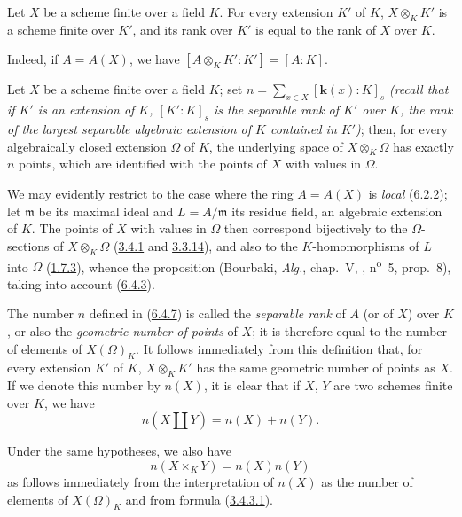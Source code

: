 \begin{corollary}[6.4.6]
\label{I.6.4.6}
Let $X$ be a scheme finite over a field $K$. For every extension $K'$ of $K$,
$X\otimes_K K'$ is a scheme finite over $K'$, and its rank over $K'$ is equal
to the rank of $X$ over $K$.
\end{corollary}

Indeed, if $A=A(X)$, we have $[A\otimes_K K':K']=[A:K]$.

\begin{corollary}[6.4.7]
\label{I.6.4.7}
Let $X$ be a scheme finite over a field $K$; set
$n=\sum_{x\in X}[\boldsymbol{k}(x):K]_s$
\emph{(recall that if $K'$ is an extension of $K$, $[K':K]_s$ is the
\emph{separable rank} of $K'$ over $K$, the rank of the largest separable
algebraic extension of $K$ contained in $K'$)};
then, for every algebraically closed extension $\Omega$ of $K$, the
underlying space of $X\otimes_K\Omega$ has exactly $n$ points, which are
identified with the points of $X$ with values in $\Omega$.
\end{corollary}

We may evidently restrict to the case where the ring $A=A(X)$ is \emph{local}
(\hyperref[I.6.2.2]{6.2.2}); let $\mathfrak m$ be its maximal ideal and
$L=A/\mathfrak m$ its residue field, an algebraic extension of $K$. The points
of $X$ with values in $\Omega$ then correspond bijectively to the
$\Omega$-sections of $X\otimes_K\Omega$
(\hyperref[I.3.4.1]{3.4.1} and \hyperref[I.3.3.14]{3.3.14}), and also
to the $K$-homomorphisms of $L$ into $\Omega$
(\hyperref[I.1.7.3]{1.7.3}), whence the proposition (Bourbaki, \emph{Alg.},
chap.~V, , n\textsuperscript{o}~5, prop.~8), taking into
account (\hyperref[I.6.4.3]{6.4.3}).

\begin{env}[6.4.8]
\label{I.6.4.8}
The number $n$ defined in (\hyperref[I.6.4.7]{6.4.7}) is called the
\emph{separable rank} of $A$ (or of $X$) over $K$, or also the
\emph{geometric number of points} of $X$; it is therefore equal to the number
of elements of $X(\Omega)_K$. It follows immediately from this definition
that, for every extension $K'$ of $K$, $X\otimes_K K'$ has the same geometric
number of points as $X$. If we denote this number by $n(X)$, it is clear that
if $X$, $Y$ are two schemes finite over $K$, we have
\[
  n(X\amalg Y)=n(X)+n(Y).
  \tag{6.4.8.1}\label{I.6.4.8.1}
\]

Under the same hypotheses, we also have
\[
  n(X\times_K Y)=n(X)n(Y)
  \tag{6.4.8.2}\label{I.6.4.8.2}
\]
as follows immediately from the interpretation of $n(X)$ as the number
of elements of $X(\Omega)_K$ and from formula
(\hyperref[I.3.4.3.1]{3.4.3.1}).
\end{env}

